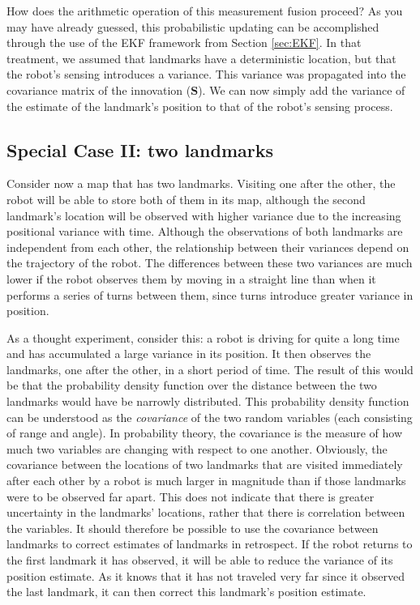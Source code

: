 How does the arithmetic operation of this measurement fusion proceed? As you may have already guessed, this probabilistic updating can be accomplished through the use of the EKF framework from Section \ref{sec:EKF}. In that treatment, we assumed that landmarks have a deterministic location, but that the robot's sensing introduces a variance. This variance was propagated into the covariance matrix of the innovation ($ \boldsymbol{S}$). We can now simply add the variance of the estimate of the landmark's position to that of the robot's sensing process.

\subsection{Special Case II: two landmarks}
Consider now a map that has two landmarks. Visiting one after the other, the robot will be able to store both of them in its map, although the second landmark's location will be observed with higher variance due to the increasing positional variance with time. Although the observations of both landmarks are independent from each other, the relationship between their variances depend on the trajectory of the robot. The differences between these two variances are much lower if the robot observes them by moving in a straight line than when it performs a series of turns between them, since turns introduce greater variance in position.

As a thought experiment, consider this: a robot is driving for quite a long time and has accumulated a large variance in its position. It then observes the landmarks, one after the other, in a short period of time. The result of this would be that the probability density function over the distance between the two landmarks would have be narrowly distributed. This probability density function can be understood as the \emph{covariance} of the two random variables (each consisting of range and angle). In probability theory, the covariance is the measure of how much two variables are changing with respect to one another. Obviously, the covariance between the locations of two landmarks that are visited immediately after each other by a robot is much larger in magnitude than if those landmarks were to be observed far apart. This does not indicate that there is greater uncertainty in the landmarks' locations, rather that there is correlation between the variables. It should therefore be possible to use the covariance between landmarks to correct estimates of landmarks in retrospect. If the robot returns to the first landmark it has observed, it will be able to reduce the variance of its position estimate. As it knows that it has not traveled very far since it observed the last landmark, it can then correct this landmark's position estimate.

